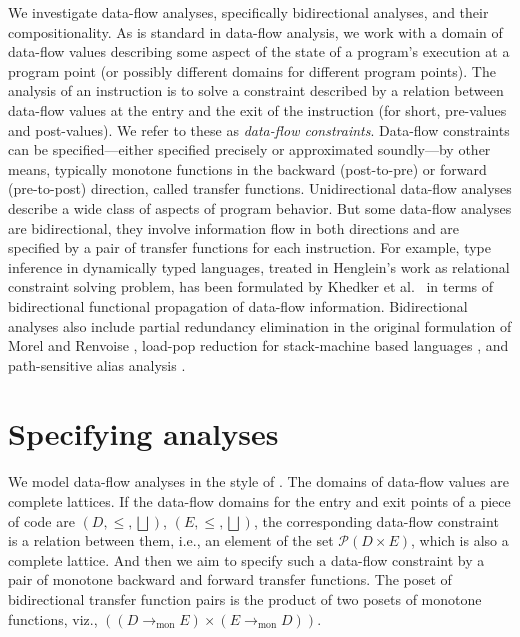 \documentclass{easychair}
\theoremstyle{definition}
\newcommand{\Pow}{\mathcal{P}}
\newcommand{\tomon}{\to_{\mathrm{mon}}}
\newcommand{\ff}{{f^{\rightarrow}}}
\newcommand{\fb}{{f^{\leftarrow}}}
\newcommand{\gf}{{g^{\rightarrow}}}
\newcommand{\gb}{{g^{\leftarrow}}}
\newcommand{\bigjoin}{\bigsqcup}
\begin{document}
We investigate data-flow analyses, specifically bidirectional analyses, and their compositionality.
As is standard in data-flow analysis, we work with a domain of data-flow values describing some aspect of the state of a program's execution at a program point (or possibly different domains for different program points).
The analysis of an instruction is to solve a constraint described by a relation between data-flow values at the entry and the exit of the instruction (for short, pre-values and post-values). We refer to these as \emph{data-flow constraints}.
Data-flow constraints can be specified---either specified precisely or approximated soundly---by other means, typically monotone functions in the backward (post-to-pre) or forward (pre-to-post) direction, called transfer functions.
Unidirectional data-flow analyses describe a wide class of aspects of program behavior. But some data-flow analyses are bidirectional, they involve information flow in both directions and are specified by a pair of transfer functions for each instruction.
For example, type inference in dynamically typed languages, treated in Henglein's work \cite{henglein_dynamic_1992} as relational constraint solving problem,
has been formulated by Khedker et al.~\cite{DBLP:journals/cl/KhedkerDM03} in terms of bidirectional functional propagation of data-flow information.
Bidirectional analyses also include partial redundancy elimination in the original formulation of Morel and Renvoise \cite{DBLP:journals/cacm/MorelR79,khedker_bidirectional_1999}, load-pop reduction for stack-machine based languages \cite{stack,SU}, and path-sensitive alias analysis \cite{jaiswal_bidirectionality_2020}.

\section{Specifying analyses}

We model data-flow analyses in the style of
\cite{frade_bidirectional_2009}.  The domains of data-flow values are
complete lattices. %
If the data-flow domains for the entry and exit points of a piece of code are $(D, \leq, \bigjoin)$,
$(E, \leq, \bigjoin)$, the corresponding data-flow constraint is a
relation between them, i.e., an element of the set
$\Pow(D \times E)$, which is also a complete lattice.
And then we aim to specify such a
data-flow constraint by a pair of monotone backward and forward
transfer functions. The poset of bidirectional transfer function pairs
is the product of two posets of monotone functions, viz.,
$((D \tomon E) \times (E \tomon D))$.
\end{document}

